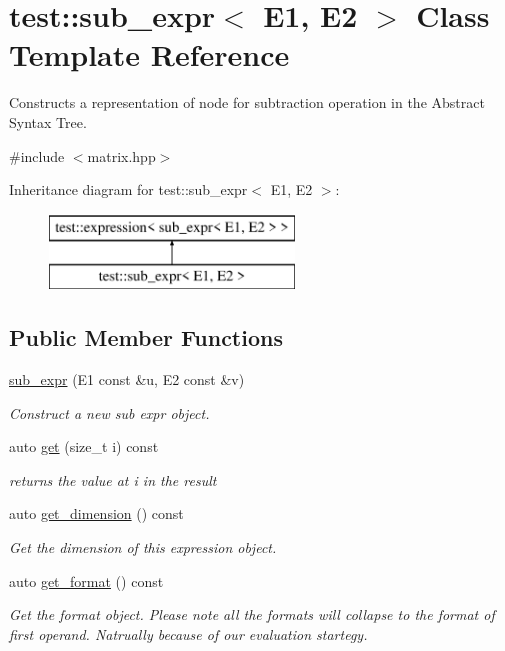 \hypertarget{classtest_1_1sub__expr}{}\section{test\+::sub\+\_\+expr$<$ E1, E2 $>$ Class Template Reference}
\label{classtest_1_1sub__expr}


Constructs a representation of node for subtraction operation in the Abstract Syntax Tree.  




{\ttfamily \#include $<$matrix.\+hpp$>$}

Inheritance diagram for test\+::sub\+\_\+expr$<$ E1, E2 $>$\+:\begin{figure}[H]
\begin{center}
\leavevmode
\includegraphics[height=2.000000cm]{classtest_1_1sub__expr}
\end{center}
\end{figure}
\subsection*{Public Member Functions}
\begin{DoxyCompactItemize}
\item 
\mbox{\hyperlink{classtest_1_1sub__expr_ac9dc8bae83439a35afd865aeb9ccf463}{sub\+\_\+expr}} (E1 const \&u, E2 const \&v)
\begin{DoxyCompactList}\small\item\em Construct a new sub expr object. \end{DoxyCompactList}\item 
auto \mbox{\hyperlink{classtest_1_1sub__expr_aa2d19c9aa74ca2dbf9c9b18662ab932a}{get}} (size\+\_\+t i) const
\begin{DoxyCompactList}\small\item\em returns the value at i in the result \end{DoxyCompactList}\item 
auto \mbox{\hyperlink{classtest_1_1sub__expr_ab98cf11cec8f1f403ce26f0b665544c3}{get\+\_\+dimension}} () const
\begin{DoxyCompactList}\small\item\em Get the dimension of this expression object. \end{DoxyCompactList}\item 
auto \mbox{\hyperlink{classtest_1_1sub__expr_a6da1993144ab26f2c9fb696893f101ab}{get\+\_\+format}} () const
\begin{DoxyCompactList}\small\item\em Get the format object. Please note all the formats will collapse to the format of first operand. Natrually because of our evaluation startegy. \end{DoxyCompactList}\end{DoxyCompactItemize}


